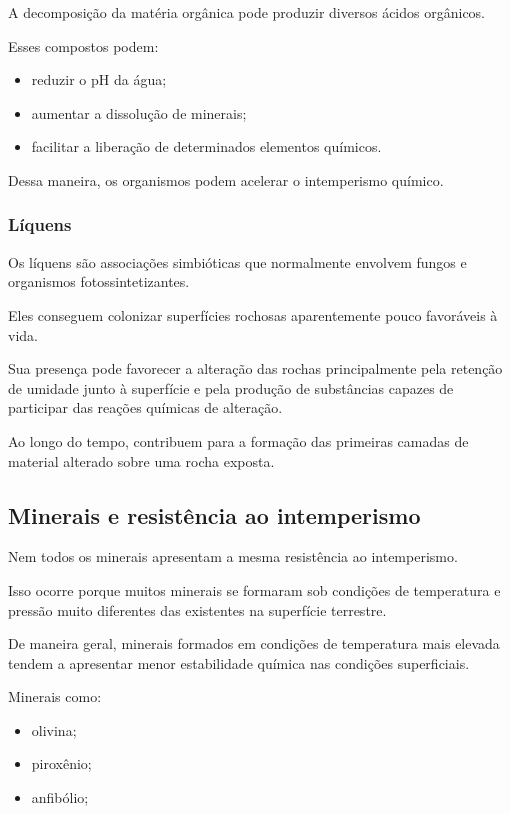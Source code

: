 A decomposição da matéria orgânica pode produzir diversos ácidos orgânicos.

Esses compostos podem:

\begin{itemize}
    \item reduzir o pH da água;
    \item aumentar a dissolução de minerais;
    \item facilitar a liberação de determinados elementos químicos.
\end{itemize}

Dessa maneira, os organismos podem acelerar o intemperismo químico.

\subsubsection{Líquens}

Os líquens são associações simbióticas que normalmente envolvem fungos e organismos fotossintetizantes.

Eles conseguem colonizar superfícies rochosas aparentemente pouco favoráveis à vida.

Sua presença pode favorecer a alteração das rochas principalmente pela retenção de umidade junto à superfície e pela produção de substâncias capazes de participar das reações químicas de alteração.

Ao longo do tempo, contribuem para a formação das primeiras camadas de material alterado sobre uma rocha exposta.

\subsection{Minerais e resistência ao intemperismo}

Nem todos os minerais apresentam a mesma resistência ao intemperismo.

Isso ocorre porque muitos minerais se formaram sob condições de temperatura e pressão muito diferentes das existentes na superfície terrestre.

De maneira geral, minerais formados em condições de temperatura mais elevada tendem a apresentar menor estabilidade química nas condições superficiais.

Minerais como:

\begin{itemize}
    \item olivina;
    \item piroxênio;
    \item anfibólio;
\end{itemize}

